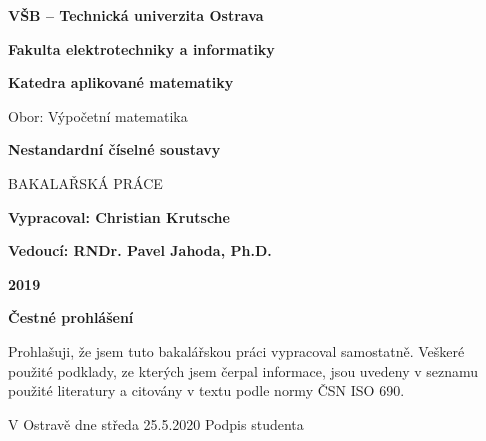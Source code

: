 \documentclass[12pt]{book}
\begin{document}
\begin{titlepage}
   \begin{center}
		 		\textbf{VŠB – Technická univerzita Ostrava}
		 			
		 			\vspace{0.5cm}
		 			
		 		\textbf{Fakulta elektrotechniky a informatiky}
		 		
		 		\vspace{0.5cm}
		 		
		 		\textbf{Katedra aplikované matematiky}
		 		
		 		\vspace{1.5cm}
		 		
		 		Obor: Výpočetní matematika
		 		
		 		\vspace{2.5cm}
		 		
       \textbf{{\huge Nestandardní číselné soustavy}}

       \vspace{1cm}

       BAKALAŘSKÁ PRÁCE

       \vspace{3cm}

       \textbf{Vypracoval: Christian Krutsche}

      \vspace{0.5cm}

       \textbf{Vedoucí: RNDr. Pavel Jahoda, Ph.D.}

       \vspace{1cm}

       \textbf{2019}

     	


   \end{center}
\end{titlepage}
	
		\vspace{15cm}

\textbf{Čestné prohlášení}

\begin{center}
	Prohlašuji, že jsem tuto bakalářskou práci vypracoval samostatně. Veškeré použité podklady, ze
kterých jsem čerpal informace, jsou uvedeny v seznamu použité literatury a citovány v textu
podle normy ČSN ISO 690.
\end{center}

\vspace{2.5cm}

V Ostravě dne středa 25.5.2020
Podpis studenta
\end{document}
